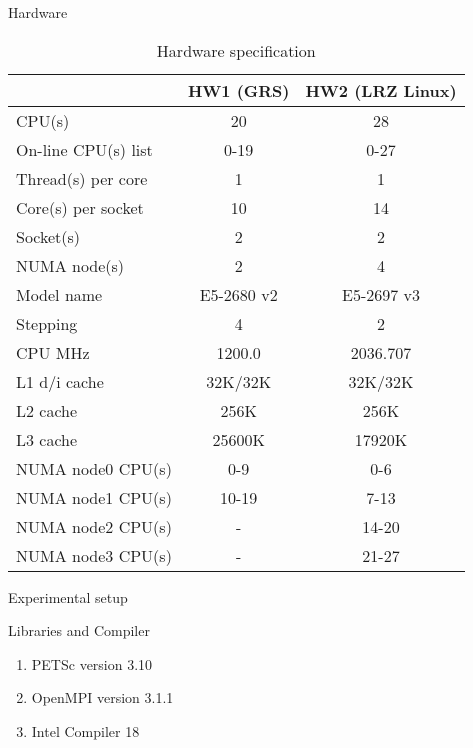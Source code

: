 \begin{frame}[t]{Hardware}
    \begin{table}[ht]
\centering
\footnotesize
\begin{tabular}{|l|c|c|}
\hline
                    & HW1 (GRS) & HW2 (LRZ Linux) \\ \hline
CPU(s)              & 20 &  28 \\ \hline
On-line CPU(s) list & 0-19 &  0-27 \\ \hline
Thread(s) per core  & 1 &  1 \\  \hline
Core(s) per socket  & 10 & 14 \\ \hline
Socket(s)           & 2 &  2 \\ \hline
NUMA node(s)        & 2 &  4 \\ \hline
Model name          & E5-2680 v2 & 
E5-2697 v3 \\ \hline
Stepping            & 4 &  2 \\ \hline
CPU MHz             & 1200.0 &  2036.707 \\ \hline
L1 d/i cache        & 32K/32K &  32K/32K \\ \hline
L2 cache            & 256K &  256K \\ \hline
L3 cache            & 25600K &  17920K \\ \hline
NUMA node0 CPU(s)   & 0-9 &  0-6 \\ \hline
NUMA node1 CPU(s)   & 10-19 &  7-13 \\ \hline
NUMA node2 CPU(s)   & - &  14-20 \\ \hline
NUMA node3 CPU(s)   & - &  21-27 \\ \hline
\end{tabular}
\caption{Hardware specification}
\label{table:hardware-spec}
\end{table}
    
\end{frame}





\begin{frame}{Experimental setup}

    \justifying
    
    \begin{block} {Libraries and Compiler}
        \begin{enumerate}
            \item PETSc version 3.10
        \item OpenMPI version 3.1.1
            \item Intel Compiler 18
        \end{enumerate}
    \end{block}

\end{frame}
